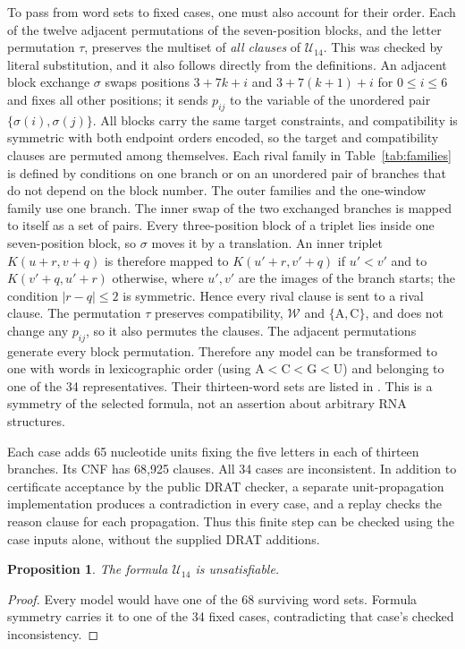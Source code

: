 \documentclass[11pt,a4paper]{article}
\newtheorem{proposition}[theorem]{Proposition}
\theoremstyle{definition}
\newcommand{\AC}{\{\mathrm A,\mathrm C\}}
\newcommand{\WC}{\mathcal W}
\newcommand{\U}{\mathcal U_{14}}
\begin{document}
To pass from word sets to fixed cases, one must also account for their
order. Each of the twelve adjacent permutations of the seven-position
blocks, and the letter permutation $\tau$, preserves the multiset of
\emph{all clauses} of $\U$. This was checked by literal substitution,
and it also follows directly from the definitions. An adjacent block
exchange $\sigma$ swaps positions $3+7k+i$ and $3+7(k+1)+i$ for
$0\leq i\leq6$ and fixes all other positions; it sends $p_{ij}$ to the
variable of the unordered pair $\{\sigma(i),\sigma(j)\}$. All blocks
carry the same target constraints, and compatibility is symmetric with
both endpoint orders encoded, so the target and compatibility clauses
are permuted among themselves. Each rival family in
Table~\ref{tab:families} is defined by conditions on one branch or on an
unordered pair of branches that do not depend on the block number. The
outer families and the one-window family use one branch. The inner
swap of the two exchanged branches is mapped to itself as a set of
pairs. Every three-position block of a triplet lies inside one
seven-position block, so $\sigma$ moves it by a translation. An inner
triplet $K(u+r,v+q)$ is therefore mapped to $K(u'+r,v'+q)$ if $u'<v'$
and to $K(v'+q,u'+r)$ otherwise, where $u',v'$ are the images of the
branch starts; the condition $|r-q|\leq2$ is symmetric. Hence every rival clause is sent to a rival clause. The
permutation $\tau$ preserves compatibility, $\WC$ and $\AC$, and does
not change any $p_{ij}$, so it also permutes the clauses.
The adjacent permutations generate every block permutation. Therefore
any model can be transformed to one with words in lexicographic order
(using $\mathrm A<\mathrm C<\mathrm G<\mathrm U$)
and belonging to one of the 34 representatives. Their thirteen-word
sets are listed in . This is a symmetry of
the selected formula, not an assertion about arbitrary RNA structures.

Each case adds 65 nucleotide units fixing the five letters in each of
thirteen branches. Its CNF has 68,925 clauses. All 34 cases are
inconsistent. In addition to certificate acceptance by the public
DRAT checker, a separate unit-propagation implementation produces a
contradiction in every case, and a replay checks the reason clause for
each propagation. Thus this finite step can be checked using the case
inputs alone, without the supplied DRAT additions.

\begin{proposition}\label{prop:u}
The formula $\U$ is unsatisfiable.
\end{proposition}
\begin{proof}
Every model would have one of the 68 surviving word sets. Formula
symmetry carries it to one of the 34 fixed cases, contradicting that
case's checked inconsistency.
\end{proof}
\end{document}
